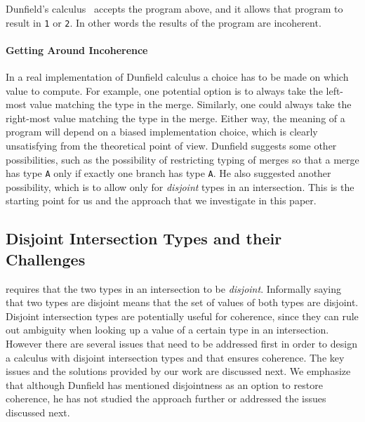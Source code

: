 Dunfield's calculus~\cite{dunfield2014elaborating} accepts the program
above, and it allows that program to result in \lstinline$1$ or \lstinline$2$.
In other words the results of the program are incoherent.

\paragraph{Getting Around Incoherence}
In a real implementation of Dunfield calculus a choice has to be made
on which value to compute. For example, one potential option is to
always take the left-most value matching the type in the
merge. Similarly, one could always take the right-most value matching
the type in the merge. Either way, the meaning of a program will
depend on a biased implementation choice, which is clearly
unsatisfying from the theoretical point of view.  Dunfield suggests
some other possibilities, such as the possibility of restricting typing
of merges so that a merge has type \lstinline$A$ only if exactly one
branch has type \lstinline$A$. He also suggested another possibility,
which is to allow only for \emph{disjoint} types in an intersection.
This is the starting point for us and the approach that we 
investigate in this paper. 

\subsection{Disjoint Intersection Types and their Challenges}\label{subsec:challenges}
\name requires that the
two types in an intersection to be \emph{disjoint}.
Informally saying that two types are disjoint means that the set of
values of both types are disjoint. Disjoint intersection types are
potentially useful for coherence, since they can rule out ambiguity
when looking up a value of a certain type in an intersection. However
there are several issues that need to be addressed first in order to
design a calculus with disjoint intersection types and that ensures
coherence. The key issues and the solutions provided by our work are
discussed next. We emphasize that although Dunfield
has mentioned disjointness as an option to restore coherence, he
has not studied the approach further or addressed the issues discussed next.

